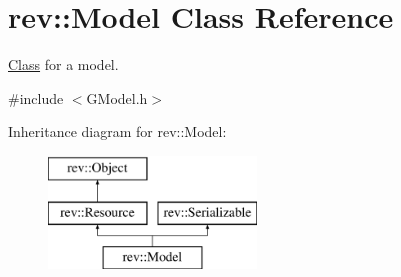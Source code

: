 \hypertarget{classrev_1_1_model}{}\section{rev\+::Model Class Reference}
\label{classrev_1_1_model}


\mbox{\hyperlink{struct_class}{Class}} for a model.  




{\ttfamily \#include $<$G\+Model.\+h$>$}

Inheritance diagram for rev\+::Model\+:\begin{figure}[H]
\begin{center}
\leavevmode
\includegraphics[height=3.000000cm]{classrev_1_1_model}
\end{center}
\end{figure}
